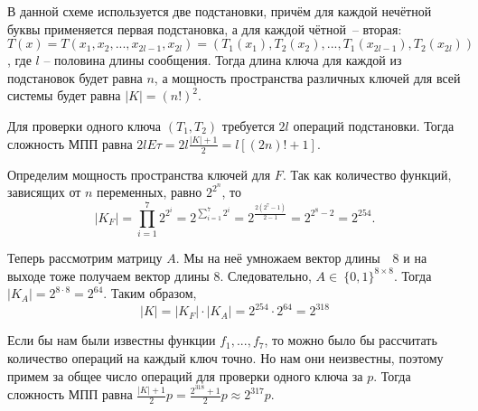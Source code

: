 \documentclass[letterpaper,11pt,openany]{book}
\begin{document}
В данной схеме используется две подстановки, причём для каждой нечётной буквы применяется первая подстановка, а для каждой чётной~-- вторая: $T(x) = T(x_1, x_2, ... , x_{2l - 1}, x_{2l}) = (T_1(x_1), T_2(x_2), ..., T_1(x_{2l - 1}), T_2(x_{2l}))$, где $l$ -- половина длины сообщения. Тогда длина ключа для каждой из подстановок будет равна $n$, а мощность пространства различных ключей для всей системы будет равна $|K| = (n!)^2$.

Для проверки одного ключа $(T_1, T_2)$ требуется $2l$ операций подстановки. Тогда сложность МПП равна $2lE\tau = 2l\frac{|K| + 1}{2} = l[(2n)! + 1]$.


Определим мощность пространства ключей для $F$. Так как количество функций, зависящих от $n$ переменных, равно $2^{2^n}$, то 
$$|K_F| = \prod_{i = 1} ^ {7} 2^{2^i} = 2 ^ {\sum_{i = 1} ^ {7} 2 ^ i} = 2 ^ { \frac{2(2^7 - 1)}{2 - 1} } = 2 ^ {2^8 - 2} = 2 ^ {254}.$$

Теперь рассмотрим матрицу $A$. Мы на неё умножаем вектор длины~\ 8 и на выходе тоже получаем вектор длины 8. Следовательно, $A \in~\{0,1\}^{8 \times 8}$. Тогда $|K_A| = 2 ^ {8 \cdot 8} = 2 ^ {64}$. Таким образом, 
$$|K| = |K_F| \cdot |K_A| = 2 ^ {254} \cdot 2 ^ {64} = 2 ^ {318}$$

Если бы нам были известны функции $f_1,...,f_7$, то можно было бы рассчитать количество операций на каждый ключ точно. Но нам они неизвестны, поэтому примем за общее число операций для проверки одного ключа за $p$. Тогда сложность МПП равна $\frac{|K| + 1}{2}p = \frac{2^{318} + 1}{2}p \approx 2 ^ {317} p.$ \\
\end{document}
